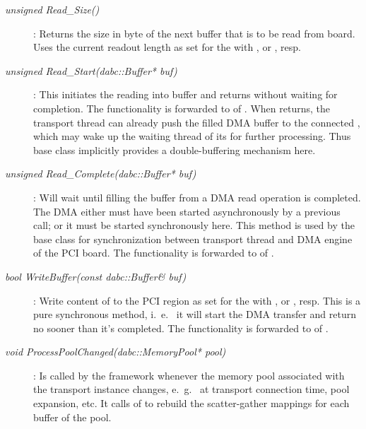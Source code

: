  \begin{description} 


\item[\em unsigned Read\_Size()] :
Returns the size in byte of the next buffer that is to be read from board. 
Uses the current readout length as set for the 
with , or , resp.

\item[\em unsigned Read\_Start(dabc::Buffer* buf)] :
This initiates the reading into buffer  and returns
without waiting for completion. The functionality is
forwarded to  of . 
When  returns, the transport thread
can already push the  filled DMA buffer 
to the connected , 
which may wake up the waiting thread of its  for further
processing. Thus base class  
implicitly provides a double-buffering mechanism here.

\item[\em unsigned Read\_Complete(dabc::Buffer* buf)] :
Will wait until filling the buffer  from a DMA read operation
is completed. The DMA either must have been started asynchronously 
by a previous  call; or it must be started 
synchronously here.
This method is used by the base class for synchronization
between transport thread and DMA engine of the PCI board. 
The functionality is forwarded to  
of . 


\item[\em bool WriteBuffer(const dabc::Buffer& buf)] :
Write content of  to the PCI region 
as set for the 
with , or , resp.
This is a pure synchronous method, i.~e.~ it will start the DMA
transfer and return no sooner than it's completed.
The functionality is forwarded to  
of . 

\item[\em void ProcessPoolChanged(dabc::MemoryPool* pool)] :
Is called by the framework whenever the memory pool associated with the 
transport instance changes, e.~g.~ at transport connection time, 
pool expansion, etc. It calls  
of 
to rebuild the scatter-gather mappings for each buffer of the pool.


\end{description} 

